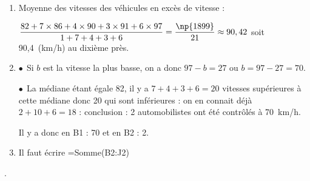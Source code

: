 \begin{enumerate}
	\begin{enumerate}
		\item %
Moyenne des vitesses des véhicules en excès de vitesse : 
		
		$\dfrac{82 + 7 \times 86 + 4 \times 90 + 3 \times 91 + 6 \times 97}{1 + 7 + 4 + 3 + 6} = \dfrac{\np{1899}}{21} \approx 90,42$ soit 90,4~(km/h) au dixième près.
		\item %
$\bullet~~$Si $b$ est la vitesse la plus basse, on a donc $97 - b = 27$ ou $b = 97 - 27 = 70$.

$\bullet~~$La médiane étant égale 82, il y a $7 + 4 + 3 + 6 = 20$ vitesses supérieures à cette médiane donc 20 qui sont inférieures : on en connait déjà $2 + 10 + 6 = 18$ : conclusion : 2 automobilistes ont été contrôlés à 70~km/h.

Il y a donc en B1  : 70 et en B2 : 2.
		\item %
		Il faut écrire =Somme(B2:J2)
	\end{enumerate}.
\end{enumerate}

\bigskip

